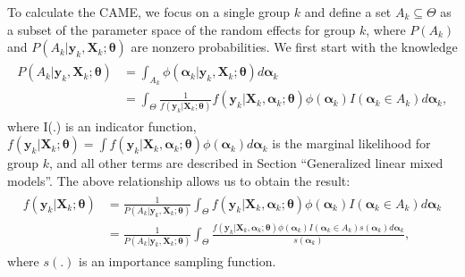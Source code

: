 To calculate the CAME, we focus on a single group \(k\) and define a set
\(A_k \subseteq \Theta\) as a subset of the parameter space of the
random effects for group \(k\), where \(P(A_k)\) and
\(P(A_k |\boldsymbol y_k, \boldsymbol X_k; \boldsymbol \theta)\) are
nonzero probabilities. We first start with the knowledge \begin{align}
\begin{aligned}
  P(A_k | \boldsymbol y_k, \boldsymbol X_k; \boldsymbol\theta) & = \int_{A_k} \phi(\boldsymbol\alpha_k | \boldsymbol y_k, \boldsymbol X_k; \boldsymbol\theta) d \boldsymbol\alpha_k \\
  & = \int_\Theta \frac{1}{f(\boldsymbol y_k | \boldsymbol X_k; \boldsymbol\theta)} f(\boldsymbol y_k | \boldsymbol X_k, \boldsymbol\alpha_k; \boldsymbol\theta) \phi(\boldsymbol\alpha_k) I(\boldsymbol\alpha_k \in A_k) d \boldsymbol\alpha_k,
\end{aligned}
\end{align} where I(.) is an indicator function,
\(f(\boldsymbol y_k | \boldsymbol X_k; \boldsymbol \theta) = \int f(\boldsymbol y_k | \boldsymbol X_k, \boldsymbol \alpha_k; \boldsymbol \theta) \phi(\boldsymbol \alpha_k) d \boldsymbol \alpha_k\)
is the marginal likelihood for group \(k\), and all other terms are
described in Section ``Generalized linear mixed models''. The above relationship allows
us to obtain the result: \begin{align}
\begin{aligned}
  f(\boldsymbol y_k | \boldsymbol X_k; \boldsymbol\theta) & = \frac{1}{P(A_k|\boldsymbol y_k, \boldsymbol X_k; \boldsymbol\theta)} \int_\Theta f(\boldsymbol y_k | \boldsymbol X_k, \boldsymbol\alpha_k; \boldsymbol\theta) \phi(\boldsymbol\alpha_k) I(\boldsymbol\alpha_k \in A_k) d \boldsymbol\alpha_k \\
  & = \frac{1}{P(A_k|\boldsymbol y_k, \boldsymbol X_k; \boldsymbol\theta)} \int_\Theta \frac{f(\boldsymbol y_k | \boldsymbol X_k, \boldsymbol\alpha_k; \boldsymbol\theta) \phi(\boldsymbol\alpha_k) I(\boldsymbol\alpha_k \in A_k) s(\boldsymbol\alpha_k) d \boldsymbol\alpha_k}{s(\boldsymbol\alpha_k)},
  \label{eqn:pajor}
\end{aligned}
\end{align} where \(s(.)\) is an importance sampling function.

